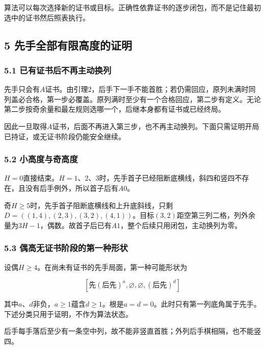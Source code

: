 \documentclass[
  a4paper,
]{article}
\begin{document}
算法可以每次选择新的证书或目标。正确性依靠证书的逐步闭包，而不是记住最初选中的证书然后照表执行。

\subsection{5
先手全部有限高度的证明}\label{ux5148ux624bux5168ux90e8ux6709ux9650ux9ad8ux5ea6ux7684ux8bc1ux660e}

\subsubsection{5.1
已有证书后不再主动换列}\label{ux5df2ux6709ux8bc1ux4e66ux540eux4e0dux518dux4e3bux52a8ux6362ux5217}

先手只会有\(A\)证书。由引理2，后手下一手不能首胜；若仍需回应，原列未满时同列盖必合格，第一步必覆盖。原列满时至少有一个合格回应，第二步有定义。无论第二步按奇余量和最左规则选哪一个，后继本身都有证书或已经终局。

因此一旦取得\(A\)证书，后面不再进入第三步，也不再主动换列。下面只需证明开局已持证，或无证书阶段仍能安全继续。

\subsubsection{5.2
小高度与奇高度}\label{ux5c0fux9ad8ux5ea6ux4e0eux5947ux9ad8ux5ea6}

\(H=0\)直接结束。\(H=1\)、2、3时，先手首子已经阻断底横线，斜四和竖四不存在，且没有后手例外，所以首子后有\(A0\)。

奇\(H\ge 5\)时，先手首子阻断底横线和上升底斜线，只剩\(D=((1,4),(2,3),(3,2),(4,1))\)。目标\((3,2)\)距空第三列二格，列外余量为\(3H-1\)，偶数。故首子后已有\(A1\)，整个后续只用闭包，主动换列为零。

\subsubsection{5.3
偶高无证书阶段的第一种形状}\label{ux5076ux9ad8ux65e0ux8bc1ux4e66ux9636ux6bb5ux7684ux7b2cux4e00ux79cdux5f62ux72b6}

设偶\(H\ge 4\)。在尚未有证书的先手局面，第一种可能形状为

\[[\text{先}(\text{后先})^a,\varnothing ,\varnothing ,(\text{后先})^d]\]

其中\(a\)、\(d\)非负，\(a\ge 1\)蕴含\(d\ge 1\)。根是\(a=d=0\)。此时只有第一列底角属于先手。下述分类只用于证明，不作为算法状态。

后手每手落后至少有一条空中列，故不能非竖直首胜；外列后手棋相隔，也不能竖四。
\end{document}
